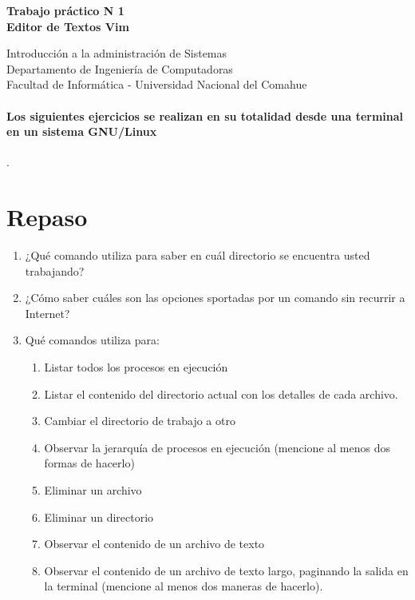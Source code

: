 \documentclass[12pt]{article}
\def\maketitle{

 \makeatletter
 {\color{bl} \centering \huge \sc \textbf{
Trabajo práctico N 1 \\
\large \vspace*{-8pt} \color{black} Editor de Textos Vim
 \vspace*{8pt} }\par}
 \makeatother


 \makeatletter
 {\centering \small 
	Introducción a la administración de Sistemas \\
 	Departamento de Ingeniería de Computadoras \\
 	Facultad de Informática - Universidad Nacional del Comahue \\
 	\vspace{20pt} }
 \makeatother

}
\begin{document}
\thispagestyle{empty}
\maketitle
\setlength{\parindent}{0pt}

\paragraph{Los siguientes ejercicios se realizan en su totalidad desde una terminal
en un sistema GNU/Linux}. 

\section*{Repaso}
\begin{enumerate}
\item ¿Qué comando utiliza para saber en cuál directorio se encuentra usted trabajando?
\item ¿Cómo saber cuáles son las opciones sportadas por un comando sin recurrir a Internet?
\item Qué comandos utiliza para: 
	\begin{enumerate}
	\item Listar todos los procesos en ejecución
	\item Listar el contenido del directorio actual con los detalles de cada archivo. 
	\item Cambiar el directorio de trabajo a otro
	\item Observar la jerarquía de procesos en ejecución (mencione al menos dos formas de hacerlo)
	\item Eliminar un archivo
	\item Eliminar un directorio 
	\item Observar el contenido de un archivo de texto
	\item Observar el contenido de un archivo de texto largo, paginando la salida en 
	la terminal (mencione al menos dos maneras de hacerlo). 
	\end{enumerate}
\end{enumerate}
\end{document}

